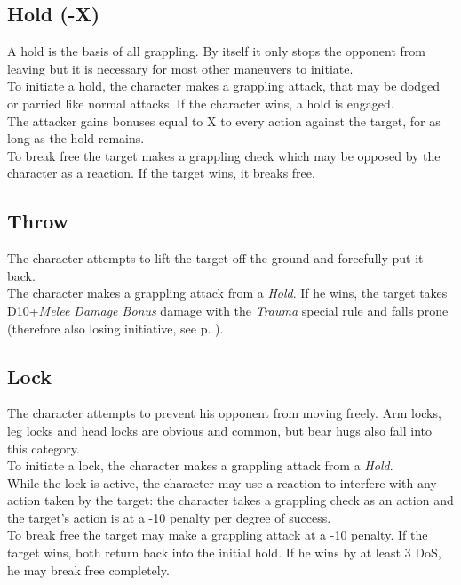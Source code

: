 \subsection*{Hold (-X)}
A hold is the basis of all grappling. By itself it only stops the opponent from leaving but it is necessary for most other maneuvers to initiate.\\
To initiate a hold, the character makes a grappling attack,
	that may be dodged or parried like normal attacks.
If the character wins, a hold is engaged.
\\%
The attacker gains bonuses equal to X to every action against the target, for as long as the hold remains.\\
To break free the target makes a grappling check which may be opposed by the character as a reaction. If the target wins, it breaks free.
\subsection*{Throw}
The character attempts to lift the target off the ground and forcefully put it back.\\
The character makes a grappling attack from a \emph{Hold}.
If he wins,
	the target takes D10+\emph{Melee Damage Bonus} damage
	with the \emph{Trauma} special rule
	and falls prone
	(therefore also losing initiative, see p. \pageref{subsec:variableini}).
\subsection*{Lock}
The character attempts to prevent his opponent from moving freely.
Arm locks, leg locks and head locks are obvious and common,
	but bear hugs also fall into this category.
\\%
To initiate a lock, the character makes a grappling attack from a \emph{Hold}.
\\%
While the lock is active,
	the character may use a reaction to interfere with any action taken by the target:
	the character takes a grappling check as an action
	and the target’s action is at a -10 penalty per degree of success.\\
To break free the target may make a grappling attack at a -10  penalty.
If the target wins, both return back into the initial hold.
If he wins by at least 3 DoS, he may break free completely.
